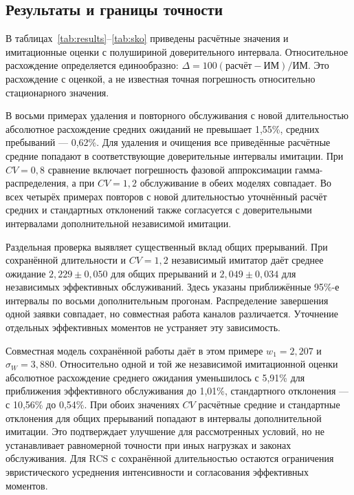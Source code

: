 \documentclass[a4paper,12pt]{article}
\begin{document}
\subsection{Результаты и границы точности}
В таблицах~\ref{tab:results}--\ref{tab:sko} приведены расчётные значения и имитационные оценки с полушириной доверительного интервала. Относительное расхождение определяется единообразно: \(\Delta=100(\text{расчёт}-\text{ИМ})/\text{ИМ}.\) Это расхождение с оценкой, а не известная точная погрешность относительно стационарного значения.

В восьми примерах удаления и повторного обслуживания с новой длительностью абсолютное расхождение средних ожиданий не превышает 1{,}55\%, средних пребываний --- 0{,}62\%. Для удаления и очищения все приведённые расчётные средние попадают в соответствующие доверительные интервалы имитации. При \(CV=0{,}8\) сравнение включает погрешность фазовой аппроксимации гамма-распределения, а при \(CV=1{,}2\) обслуживание в обеих моделях совпадает. Во всех четырёх примерах повторов с новой длительностью уточнённый расчёт средних и стандартных отклонений также согласуется с доверительными интервалами дополнительной независимой имитации.



Раздельная проверка выявляет существенный вклад общих прерываний. При сохранённой длительности и \(CV=1{,}2\) независимый имитатор даёт среднее ожидание \(2{,}229\pm0{,}050\) для общих прерываний и \(2{,}049\pm0{,}034\) для независимых эффективных обслуживаний. Здесь указаны приближённые 95\%-е интервалы по восьми дополнительным прогонам. Распределение завершения одной заявки совпадает, но совместная работа каналов различается. Уточнение отдельных эффективных моментов не устраняет эту зависимость.

Совместная модель сохранённой работы даёт в этом примере \(w_1=2{,}207\) и \(\sigma_W=3{,}880.\) Относительно одной и той же независимой имитационной оценки абсолютное расхождение среднего ожидания уменьшилось с 5{,}91\% для приближения эффективного обслуживания до 1{,}01\%, стандартного отклонения --- с 10{,}56\% до 0{,}54\%. При обоих значениях \(CV\) расчётные средние и стандартные отклонения для общих прерываний попадают в интервалы дополнительной имитации. Это подтверждает улучшение для рассмотренных условий, но не устанавливает равномерной точности при иных нагрузках и законах обслуживания. Для RCS с сохранённой длительностью остаются ограничения эвристического усреднения интенсивности и согласования эффективных моментов.
\end{document}
